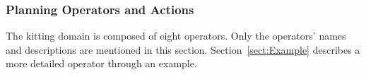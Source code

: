 \subsubsection{Planning Operators and Actions}
\label{subsect:Planning_Operators}

The kitting domain is composed of eight operators. Only the operators' names and descriptions are mentioned in this section. Section~\ref{sect:Example} describes a more detailed operator through an example.

